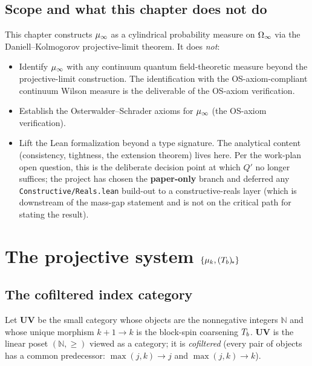\subsection{Scope and what this chapter does not do}
\label{subsec:scope}

This chapter constructs $\mu_\infty$ as a cylindrical probability measure
on $\Omega_\infty$ via the Daniell--Kolmogorov projective-limit theorem.  It
does \emph{not}:

\begin{itemize}
  \item Identify $\mu_\infty$ with any continuum quantum field-theoretic
    measure beyond the projective-limit construction.  The
    identification with the OS-axiom-compliant continuum Wilson
    measure is the deliverable of the OS-axiom verification.
  \item Establish the Osterwalder--Schrader axioms for $\mu_\infty$
    (the OS-axiom verification).
  \item Lift the Lean formalization beyond a type signature.  The
    analytical content (consistency, tightness, the extension
    theorem) lives here.  Per the work-plan  open
    question, this is the deliberate decision point at which $Q'$
    no longer suffices; the project has chosen the \textbf{paper-only}
    branch and deferred any \texttt{Constructive/Reals.lean} build-out
    to a constructive-reals layer (which is downstream of the mass-gap statement
    and is not on the critical path for stating the result).
\end{itemize}

\section{The projective system $\{\mu_k, (T_b)_{\!*}\}$}
\label{sec:projective-system}

\subsection{The cofiltered index category}
\label{subsec:cofiltered}

\begin{definition}
\label{def:uv-index}
Let $\mathbf{UV}$ be the small category whose objects are the
nonnegative integers $\mathbb{N}$ and whose unique morphism
$k+1 \to k$ is the block-spin coarsening $T_b$.  $\mathbf{UV}$ is
the linear poset $(\mathbb{N}, \ge)$ viewed as a category; it is
\emph{cofiltered} (every pair of objects has a common predecessor:
$\max(j, k) \to j$ and $\max(j, k) \to k$).
\end{definition}

